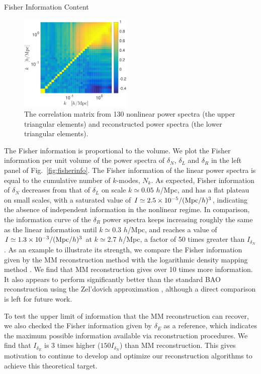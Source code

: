 \begin{section}{Fisher Information Content}
  \begin{figure}
    \centering
    \includegraphics[width=0.48\textwidth]{fig3.pdf}
    \caption{The correlation matrix from 130 nonlinear power
      spectra (the upper triangular elements) and reconstructed power
      spectra (the lower triangular elements).}
    \label{fig:corrall}
  \end{figure}

  The Fisher information is proportional to the volume. 
  We plot the Fisher information per unit volume of the power spectra of
  $\delta_N$, $\delta_L$ and $\delta_R$ in the left panel of 
  Fig.~\ref{fig:fisherinfo}. The Fisher information of the linear 
  power spectra is equal to the cumulative number of $k$-modes, $N_k$. As expected, Fisher information of
  $\delta_N$ decreases from that of $\delta_L$ on scale
  $k \simeq 0.05$ $h$/Mpc, and has a flat plateau on small scales, 
  with a saturated value of
  $I \simeq 2.5 \times 10^{-5}/({\rm Mpc}/h)^3$, indicating
  the absence of independent information in the nonlinear
  regime.  In comparison, the information curve of the $\delta_R$ power
  spectra keeps increasing roughly the same as the linear information
  until $k\simeq 0.3$ $h$/Mpc, and reaches a value of 
  $I \simeq 1.3 \times 10^{-3}/({\rm Mpc}/h)^3$ at $k \simeq 2.7$ $h$/Mpc,
  a factor of 50 times greater than $I_{\delta_N}$.
  As an example to illustrate its strength, we compare the Fisher information given by the MM reconstruction method
  with the logarithmic density mapping method \cite{bib:Mark2009}. We find that MM
  reconstruction gives over 10 times more information.  It also appears to perform 
  significantly better than the standard BAO reconstruction using the Zel'dovich 
  approximation \cite{bib:Ngan2012}, although a direct comparison is left for future work.
  
  To test the upper limit of information that the MM reconstruction can recover, 
  we also checked the Fisher information given by $\delta_E$ \cite{bib:Yu2016} as a reference, 
  which indicates the maximum possible information available via reconstruction procedures.
  We find that $I_{\delta_E}$ is 3 times higher ($150 I_{\delta_N}$) than MM reconstruction.
  This gives motivation to continue to develop and optimize our 
  reconstruction algorithms to achieve this theoretical target.
  

\end{section}
